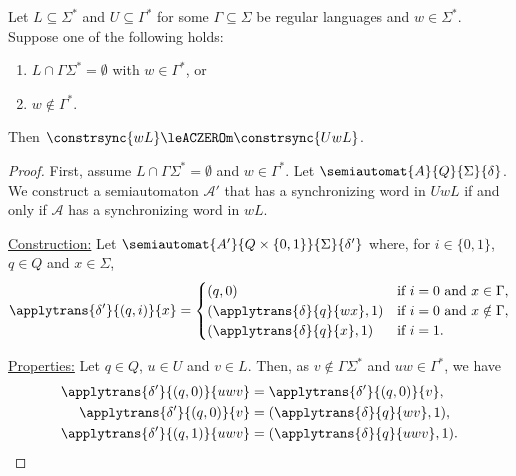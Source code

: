 \begin{proposition}
	\label{constrsync:prop:UanL}
	Let $L \subseteq \Sigma^*$ 
	and $U \subseteq \Gamma^*$ for some $\Gamma \subseteq \Sigma$
	be regular languages and $w \in \Sigma^*$.
	Suppose one of the following holds:
	\begin{enumerate}
	\item $L \cap \Gamma\Sigma^* = \emptyset$ with $w \in \Gamma^*$, or
	
	\item $w \notin \Gamma^*$.
	\end{enumerate}
	Then $\constrsync{wL} \leACZEROm \constrsync{UwL}$.
\end{proposition}         
\begin{proof} 
	First, assume $L \cap \Gamma\Sigma^* = \emptyset$ and $w \in \Gamma^*$.	
	Let $\semiautomat{A}{Q}{\Sigma}{\delta}$. We construct a semiautomaton $\mathcal A'$ that has a synchronizing
	word in $UwL$ if and only if $\mathcal A$ has a synchronizing word in $wL$.
	
	\medskip
	\noindent\underline{Construction:} Let $\semiautomat{A'}{Q \times \{0,1\}}{\Sigma}{\delta'}$
	where, for $i \in \{0,1\}$, $q \in Q$ and $x \in \Sigma$,
	\[
	\applytrans{\delta'}{(q, i)}{x} = 
	\begin{cases}
		(q, 0) & \text{if } i = 0 \text{ and } x \in \Gamma, \\
		(\applytrans{\delta}{q}{wx}, 1) & \text{if } i = 0 \text{ and } x \notin \Gamma, \\
		(\applytrans{\delta}{q}{x}, 1) & \text{if } i = 1.
	\end{cases}
	\]
	
	\noindent\underline{Properties:} Let $q \in Q$, $u \in U$ and $v \in L$.
	Then, as $v \notin \Gamma\Sigma^*$ and $uw \in \Gamma^*$,
	we have 
	\begin{align}
		\applytrans{\delta'}{(q, 0)}{uwv} & = \applytrans{\delta'}{(q, 0)}{v}, \label{constrsync:eqn:UL1} \\
		\applytrans{\delta'}{(q, 0)}{v}     & = (\applytrans{\delta}{q}{wv}, 1), \label{constrsync:eqn:UL3} \\
		\applytrans{\delta'}{(q, 1)}{uwv} & = (\applytrans{\delta}{q}{uwv}, 1). \label{constrsync:eqn:UL2}
	\end{align} 
	

\end{proof}
